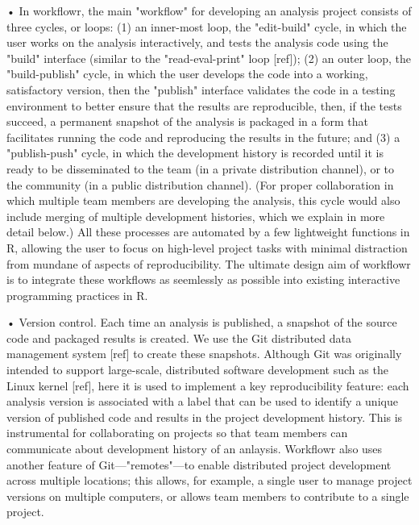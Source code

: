 \documentclass[9pt,a4paper]{extarticle}
\begin{document}
• In workflowr, the main "workflow" for developing an analysis project
consists of three cycles, or loops: (1) an inner-most loop, the
"edit-build" cycle, in which the user works on the analysis
interactively, and tests the analysis code using the "build" interface
(similar to the "read-eval-print" loop [ref]); (2) an outer loop, the
"build-publish" cycle, in which the user develops the code into a
working, satisfactory version, then the "publish" interface validates
the code in a testing environment to better ensure that the results are
reproducible, then, if the tests succeed, a permanent snapshot of the
analysis is packaged in a form that facilitates running the code and
reproducing the results in the future; and (3) a "publish-push" cycle,
in which the development history is recorded until it is ready to be
disseminated to the team (in a private distribution channel), or to the
community (in a public distribution channel). (For proper collaboration
in which multiple team members are developing the analysis, this cycle
would also include merging of multiple development histories, which we
explain in more detail below.) All these processes are automated by a
few lightweight functions in R, allowing the user to focus on high-level
project tasks with minimal distraction from mundane of aspects of
reproducibility. The ultimate design aim of workflowr is to integrate
these workflows as seemlessly as possible into existing interactive
programming practices in R.

• Version control. Each time an analysis is published, a snapshot of the
source code and packaged results is created. We use the Git distributed
data management system [ref] to create these snapshots. Although Git was
originally intended to support large-scale, distributed software
development such as the Linux kernel [ref], here it is used to implement
a key reproducibility feature: each analysis version is associated with
a label that can be used to identify a unique version of published code
and results in the project development history. This is instrumental for
collaborating on projects so that team members can communicate about
development history of an anlaysis. Workflowr also uses another feature
of Git—"remotes"—to enable distributed project development across
multiple locations; this allows, for example, a single user to manage
project versions on multiple computers, or allows team members to
contribute to a single project.
\end{document}
